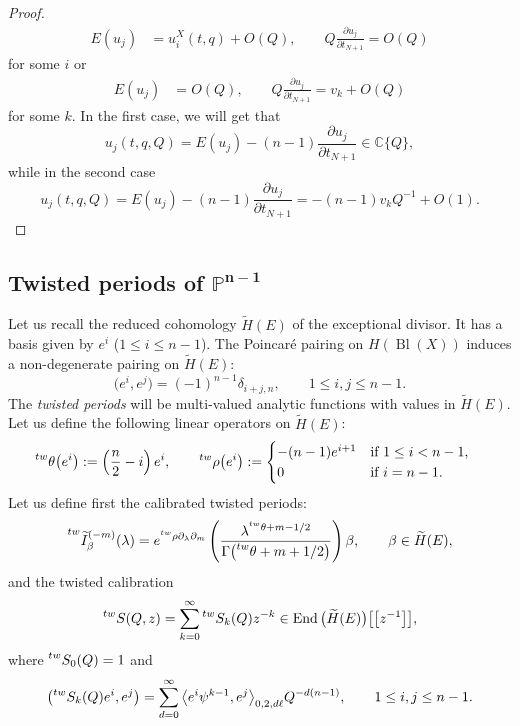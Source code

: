 \documentclass[10pt,a4paper]{article}
\numberwithin{equation}{section}
\newcommand{\leftexp}[2]{{\vphantom{#2}}^{#1}{#2}}
\newcommand{\CC}{\mathbb{C}}
\newcommand{\PP}{\mathbb{P}}
\begin{document}
\begin{proof}
\begin{align*}
E(u_j) & = u_i^X(t,q) + O(Q), \qquad
Q\frac{\partial u_j}{\partial t_{N+1}} = O(Q)
\end{align*}
for some $i$ or
\begin{align*}
E(u_j) & = O(Q),\qquad
Q\frac{\partial u_j}{\partial t_{N+1}}= v_k+ O(Q)
\end{align*}
for some $k$. In the first case, we will get that
\[
u_j(t,q,Q)= E(u_j)-(n-1) \frac{\partial u_j}{\partial t_{N+1}} \in \CC\{Q\},
\]
while in the second case
\[
u_j(t,q,Q)= E(u_j)-(n-1) \frac{\partial u_j}{\partial t_{N+1}}= -(n-1) v_k Q^{-1} + O(1).\tag*{\qed}
\] \renewcommand{\qed}{}
\end{proof}

\subsection[Twisted periods of P\^\{n-1\}]{Twisted periods of $\boldsymbol{\PP^{n-1}}$}
\label{sec:tw_periods}
Let us recall the reduced cohomology $\widetilde{H}(E)$ of the
exceptional divisor. It has a basis given by $e^i$ ($1\leq i\leq
n-1$). The Poincar\'e pairing on $H(\operatorname{Bl}(X))$ induces a non-degenerate pairing on $\widetilde{H}(E)$:
\[
\big(e^i,e^j\big) = (-1)^{n-1} \delta_{i+j,n},\qquad 1\leq i,j\leq n-1.
\]
The {\em twisted periods} will be multi-valued analytic functions with values in $\widetilde{H}(E)$.
Let us define the following linear operators on $\widetilde{H}(E)$:
\begin{align*}
\leftexp{tw}{\theta} \big(e^i\big) & := \left(\frac{n}{2} -i\right) e^i,\qquad
\leftexp{tw}{\rho} \big(e^i\big) :=
 \begin{cases}
 -(n-1) e^{i+1} & \mbox{if } 1\leq i<n-1, \\
 0 & \mbox{if } i=n-1.
 \end{cases}
\end{align*}
Let us define first the calibrated twisted periods:
\[
\leftexp{ tw}{\widetilde{I}}^{(-m)}_\beta(\lambda) =
e^{\leftexp{ tw}{\rho} \partial_\lambda \partial_m}
\left(
 \frac{
 \lambda^{ \leftexp{tw}{\theta}+m-1/2}}{
 \Gamma\big(\leftexp{tw}{\theta}+m+1/2\big)}
 \right)
 \beta,\qquad \beta\in \widetilde{H}(E),
\]
 and the twisted calibration
 \[
 \leftexp{tw}{S}(Q,z) =
\sum_{k=0}^\infty
\leftexp{tw}{S}_k(Q) z^{-k}
 \in \operatorname{End}\big(\widetilde{H}(E)\big)\big[\big[z^{-1}\big]\big],
 \]
 where $\leftexp{ tw}{S}_0(Q)=1$ and
 \[
 \big(\leftexp{tw}{S}_k(Q) e^i,e^j\big) =
 \sum_{d=0}^\infty
 \big\langle e^i\psi^{k-1},e^j\big\rangle_{0,2,d\ell} Q^{-d(n-1)},\qquad
 1\leq i,j\leq n-1.
 \]
\end{document}
